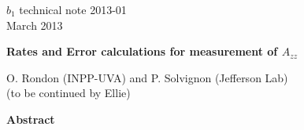 \documentclass[11pt]{article}
\begin{document}
\thispagestyle{empty}
\renewcommand{\thefootnote}{\fnsymbol{footnote}}

\begin{flushright}
{\small
$b_1$ technical note 2013-01\\
March 2013\\}
\end{flushright}

\vspace{.8cm}

\begin{center}
{\bf\large   
Rates and Error calculations for measurement of $A_{zz}$}
\vspace{1cm}


O. Rondon (INPP-UVA) and P. Solvignon (Jefferson Lab)\\
(to be continued by Ellie)
\end{center}

\vspace{2.0cm}

\begin{center}
{\bf\large   
Abstract }
\end{center}
\newpage






\end{document}
